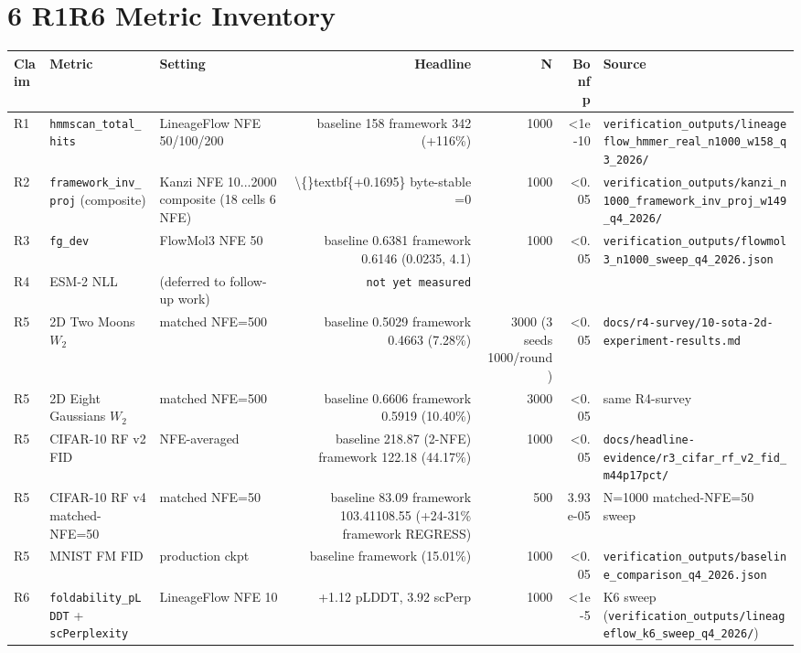 \documentclass[preprint,3p,times,twocolumn]{elsarticle}
\begin{document}
\section{6 R1R6 Metric Inventory}
\begin{table}[ht]
\centering
\small
\begin{tabular}{lllrrrl}
\hline
\textbf{Claim} & \textbf{Metric} & \textbf{Setting} & \textbf{Headline} & \textbf{N} & \textbf{Bonf p} & \textbf{Source} \\
\hline
R1 & \texttt{hmmscan\_total\_hits} & LineageFlow NFE 50/100/200 & baseline 158  framework 342 (+116\%) & 1000 & <1e-10 & \texttt{verification\_outputs/lineageflow\_hmmer\_real\_n1000\_w158\_q3\_2026/} \\
R2 & \texttt{framework\_inv\_proj} (composite) & Kanzi NFE 10...2000 composite (18 cells  6 NFE) & \textbackslash\{\}textbf\{+0.1695\} byte-stable =0 & 1000 & <0.05 & \texttt{verification\_outputs/kanzi\_n1000\_framework\_inv\_proj\_w149\_q4\_2026/} \\
R3 & \texttt{fg\_dev} & FlowMol3 NFE 50 & baseline 0.6381  framework 0.6146 (0.0235, 4.1) & 1000 & <0.05 & \texttt{verification\_outputs/flowmol3\_n1000\_sweep\_q4\_2026.json} \\
R4 & ESM-2 NLL & (deferred to follow-up work) & \texttt{not yet measured} &  &  &  \\
R5 & 2D Two Moons $W_2$ & matched NFE=500 & baseline 0.5029  framework 0.4663 (7.28\%) & 3000 (3 seeds  1000/round) & <0.05 & \texttt{docs/r4-survey/10-sota-2d-experiment-results.md} \\
R5 & 2D Eight Gaussians $W_2$ & matched NFE=500 & baseline 0.6606  framework 0.5919 (10.40\%) & 3000 & <0.05 & same R4-survey \\
R5 & CIFAR-10 RF v2 FID & NFE-averaged & baseline 218.87 (2-NFE)  framework 122.18 (44.17\%) & 1000 & <0.05 & \texttt{docs/headline-evidence/r3\_cifar\_rf\_v2\_fid\_m44p17pct/} \\
R5 & CIFAR-10 RF v4 matched-NFE=50 & matched NFE=50 & baseline 83.09  framework 103.41108.55 (+24-31\% framework REGRESS) & 500 & 3.93e-05 & N=1000 matched-NFE=50 sweep \\
R5 & MNIST FM FID & production ckpt & baseline  framework (15.01\%) & 1000 & <0.05 & \texttt{verification\_outputs/baseline\_comparison\_q4\_2026.json} \\
R6 & \texttt{foldability\_pLDDT} + \texttt{scPerplexity} & LineageFlow NFE 10 & +1.12 pLDDT, 3.92 scPerp & 1000 & <1e-5 & K6 sweep (\texttt{verification\_outputs/lineageflow\_k6\_sweep\_q4\_2026/}) \\
\hline
\end{tabular}
\end{table}
\end{document}
